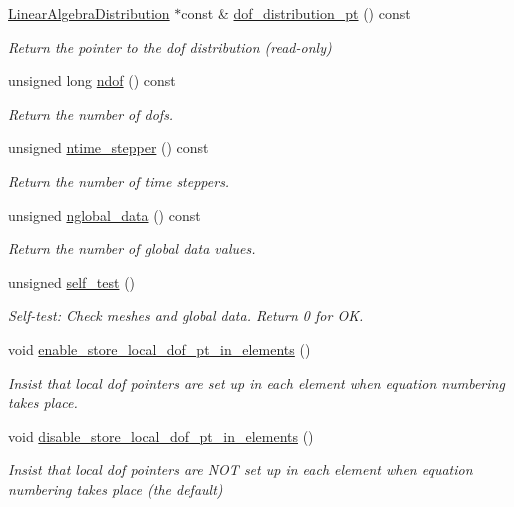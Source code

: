 \begin{DoxyCompactItemize}
\hyperlink{classoomph_1_1LinearAlgebraDistribution}{Linear\+Algebra\+Distribution} $\ast$const  \& \hyperlink{classoomph_1_1Problem_a17a5a4886c4213422179fe8346336a4e}{dof\+\_\+distribution\+\_\+pt} () const
\begin{DoxyCompactList}\small\item\em Return the pointer to the dof distribution (read-\/only) \end{DoxyCompactList}\item 
unsigned long \hyperlink{classoomph_1_1Problem_a218d4dfff74bc14f3f5dc8416236e01d}{ndof} () const
\begin{DoxyCompactList}\small\item\em Return the number of dofs. \end{DoxyCompactList}\item 
unsigned \hyperlink{classoomph_1_1Problem_ace3cdf55009c3bff21d2b7d3706d522a}{ntime\+\_\+stepper} () const
\begin{DoxyCompactList}\small\item\em Return the number of time steppers. \end{DoxyCompactList}\item 
unsigned \hyperlink{classoomph_1_1Problem_a60a9b6861928cf9115110b5bfc7d11a7}{nglobal\+\_\+data} () const
\begin{DoxyCompactList}\small\item\em Return the number of global data values. \end{DoxyCompactList}\item 
unsigned \hyperlink{classoomph_1_1Problem_acdb76c0b94aa3cc5470ce862d70a8017}{self\+\_\+test} ()
\begin{DoxyCompactList}\small\item\em Self-\/test\+: Check meshes and global data. Return 0 for OK. \end{DoxyCompactList}\item 
void \hyperlink{classoomph_1_1Problem_a31ba79405993ec52e3017d6ff3a42c8c}{enable\+\_\+store\+\_\+local\+\_\+dof\+\_\+pt\+\_\+in\+\_\+elements} ()
\begin{DoxyCompactList}\small\item\em Insist that local dof pointers are set up in each element when equation numbering takes place. \end{DoxyCompactList}\item 
void \hyperlink{classoomph_1_1Problem_ac23468bc4101d3038e6b537b6fc87aa6}{disable\+\_\+store\+\_\+local\+\_\+dof\+\_\+pt\+\_\+in\+\_\+elements} ()
\begin{DoxyCompactList}\small\item\em Insist that local dof pointers are N\+OT set up in each element when equation numbering takes place (the default) \end{DoxyCompactList}\item 

\end{DoxyCompactItemize}
